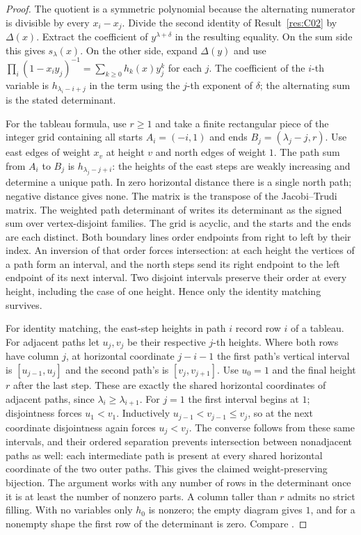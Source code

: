 \begin{proof}
The quotient is a symmetric polynomial because the alternating
numerator is divisible by every \(x_i-x_j\). Divide the second identity
of Result~\ref{res:C02} by \(\Delta(x)\). Extract the coefficient of
\(y^{\lambda+\delta}\) in the resulting equality. On the sum side this
gives \(s_\lambda(x)\). On the other side, expand \(\Delta(y)\) and use
\(\prod_{i}(1-x_i y_j)^{-1}=\sum_{k\ge0}h_k(x)y_j^k\) for each \(j\).
The coefficient of the \(i\)-th variable is \(h_{\lambda_i-i+j}\) in
the term using the \(j\)-th exponent of \(\delta\); the alternating sum
is the stated determinant.

For the tableau formula, use \(r\ge1\) and take a finite rectangular
piece of the integer grid containing all starts \(A_i=(-i,1)\) and
ends \(B_j=(\lambda_j-j,r)\). Use east edges of weight \(x_v\) at
height \(v\) and north edges of weight \(1\). The path sum from \(A_i\)
to \(B_j\) is \(h_{\lambda_j-j+i}\): the heights of the east steps are
weakly increasing and determine a unique path. In zero horizontal
distance there is a single north path; negative distance gives none.
The matrix is the transpose of the Jacobi--Trudi matrix. The weighted
path determinant of \cite[Chapter 3]{finite-combinatorics} writes its
determinant as the signed sum over vertex-disjoint families. The grid
is acyclic, and the starts and the ends are each distinct. Both
boundary lines order endpoints from right to left by their index.
An inversion of that order forces intersection: at each height the
vertices of a path form an interval, and the north steps send its
right endpoint to the left endpoint of its next interval. Two disjoint
intervals preserve their order at every height, including the case
of one height. Hence only the identity matching survives.

For identity matching, the east-step heights in path \(i\) record
row \(i\) of a tableau. For adjacent paths let \(u_j,v_j\) be their
respective \(j\)-th heights. Where both rows have column \(j\), at
horizontal coordinate \(j-i-1\) the first path's vertical interval
is \([u_{j-1},u_j]\) and the second path's is \([v_j,v_{j+1}]\).
Use \(u_0=1\) and the final height \(r\) after the last step.
These are exactly the shared horizontal coordinates of adjacent
paths, since \(\lambda_i\ge\lambda_{i+1}\).
For \(j=1\) the first interval begins at \(1\); disjointness forces
\(u_1<v_1\). Inductively \(u_{j-1}<v_{j-1}\le v_j\), so at the next
coordinate disjointness again forces \(u_j<v_j\). The converse follows
from these same intervals, and their ordered separation prevents
intersection between nonadjacent paths as well: each intermediate
path is present at every shared horizontal coordinate of the two
outer paths. This gives the claimed weight-preserving bijection.
The argument works with any number of rows in the determinant once
it is at least the number of nonzero parts. A column taller than \(r\)
admits no strict filling. With no variables only \(h_0\) is nonzero;
the empty diagram gives \(1\), and for a nonempty shape the first row
of the determinant is zero. Compare \cite[Sections 4.4--4.6]{sagan}.
\end{proof}

